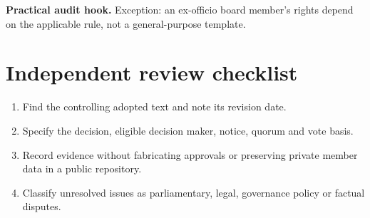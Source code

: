 \documentclass[11pt]{article}
\begin{document}
\textbf{Practical audit hook.} Exception: an ex-officio board member’s rights depend on the applicable rule, not a general-purpose template.

\section{Independent review checklist}
\begin{enumerate}[leftmargin=*,itemsep=4pt]
\item Find the controlling adopted text and note its revision date.
\item Specify the decision, eligible decision maker, notice, quorum and vote basis.
\item Record evidence without fabricating approvals or preserving private member data in a public repository.
\item Classify unresolved issues as parliamentary, legal, governance policy or factual disputes.
\end{enumerate}
\end{document}
